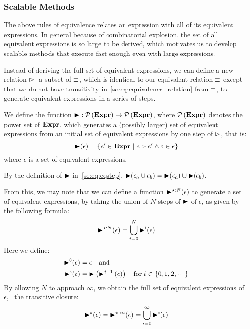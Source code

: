 \subsubsection{Scalable Methods}

The above rules of equivalence relates an expression with all of its equivalent
expressions.  In general because of combinatorial explosion, the set of all
equivalent expressions is so large to be derived, which motivates us to develop
scalable methods that execute fast enough even with large expressions.

Instead of deriving the full set of equivalent expressions, we can define
a new relation $\mathbin{\rhd}$, a subset of $\equiv$, which is identical to
our equivalent relation $\equiv$ except that we do not have transitivity
in~\eqref{so:eq:equivalence_relation} from $\equiv$, to generate equivalent
expressions in a series of steps.

We define the function $\operatorname{\blacktriangleright}: \mathcal{P}\left({\mathbf{Expr}}\right)\to\mathcal{P}\left({\mathbf{Expr}}\right)$,
where $\mathcal{P}\left({\mathbf{Expr}}\right)$ denotes the power set of $\mathbf{Expr}$, which
generates a (possibly larger) set of equivalent expressions from an initial set
of equivalent expressions by one step of $\mathbin{\rhd}$, that is:
\begin{equation}
    \operatorname{\blacktriangleright}(\epsilon) = \left\{
        e^\prime\in\mathbf{Expr} \mid
        e \mathbin{\rhd} e^\prime \wedge e\in\epsilon\right\}
    \label{so:eq:eqstep}
\end{equation}
where $\epsilon$ is a set of equivalent expressions.
\begin{corollary}
    By the definition of $\operatorname{\blacktriangleright}$ in~\eqref{so:eq:eqstep}, $\operatorname{\blacktriangleright}(\epsilon_a
    \cup \epsilon_b) = \operatorname{\blacktriangleright}(\epsilon_a) \cup \operatorname{\blacktriangleright}(\epsilon_b)$.
    \label{so:cor:union}
\end{corollary}

From this, we may note that we can define a function
$\operatorname{\blacktriangleright}^{\star:N}(\epsilon)$ to generate a set of equivalent expressions,
by taking the union of $N$ steps of $\operatorname{\blacktriangleright}$ of $\epsilon$, as given by the
following formula:
\begin{equation}
    \operatorname{\blacktriangleright}^{\star:N}(\epsilon) = \bigcup_{i = 0}^N \operatorname{\blacktriangleright}^i(\epsilon)
    \label{so:eq:transitive_generator}
\end{equation}
Here we define:
\begin{equation}
    \begin{aligned}
        \operatorname{\blacktriangleright}^0(\epsilon) &= \epsilon \quad \text{and~} \\
        \operatorname{\blacktriangleright}^i(\epsilon) &= \operatorname{\blacktriangleright}\left(
            \operatorname{\blacktriangleright}^{i - 1}\left(\epsilon\right)
        \right) \quad \text{for~} i \in \{ 0, 1, 2, \cdots \}
    \end{aligned}
\end{equation}
By allowing $N$ to approach $\infty$, we obtain the full set of equivalent
expressions of $\epsilon$, \ie~the transitive closure:
\begin{equation}
    \operatorname{\blacktriangleright}^\star(\epsilon)
    = \operatorname{\blacktriangleright}^{\star:\infty}(\epsilon)
    = \bigcup_{i = 0}^\infty \operatorname{\blacktriangleright}^i(\epsilon)
    \label{so:eq:transitive_closure}
\end{equation}

